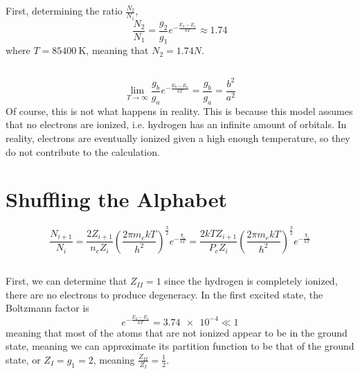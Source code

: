 \documentclass{article}
\begin{document}
\subsection{}

First, determining the ratio \(\frac{N_2}{N_1}\),
\begin{equation}
    \frac{N_2}{N_1} = \frac{g_2}{g_1} e^{-\frac{E_2 - E_1}{kT}} \approx \num{1.74}
\end{equation}
where \(T = \SI{85400}{\kelvin}\), meaning that \(N_2 = \num{1.74} N\).

\subsection{}

\begin{equation}
    \lim_{T \to \infty} \frac{g_b}{g_a} e^{-\frac{E_b - E_a}{kT}} = \frac{g_b}{g_a} = \frac{b^2}{a^2}
\end{equation}
Of course, this is not what happens in reality.
This is because this model assumes that no electrons are ionized, i.e. hydrogen has an infinite amount of orbitals.
In reality, electrons are eventually ionized given a high enough temperature, so they do not contribute to the calculation.

\section{Shuffling the Alphabet}

\begin{equation}
    \frac{N_{i + 1}}{N_i} = \frac{2 Z_{i + 1}}{n_e Z_i} \left(\frac{2 \pi m_e kT}{h^2}\right)^{\frac{3}{2}} e^{-\frac{\chi_i}{kT}} = \frac{2 kT Z_{i + 1}}{P_e Z_i} \left(\frac{2 \pi m_e kT}{h^2}\right)^{\frac{3}{2}} e^{-\frac{\chi_i}{kT}}
\end{equation}

\subsection{}

First, we can determine that \(Z_{II} = 1\) since the hydrogen is completely ionized, there are no electrons to produce degeneracy.
In the first excited state, the Boltzmann factor is 
\begin{equation}
    e^{-\frac{E_2 - E_1}{kT}} = \num{3.74e-4} \ll 1
\end{equation}
meaning that most of the atoms that are not ionized appear to be in the ground state, meaning we can approximate its partition function to be that of the ground state, or \(Z_I = g_1 = 2\), meaning \(\frac{Z_{II}}{Z_I} = \frac{1}{2}\).
\end{document}
